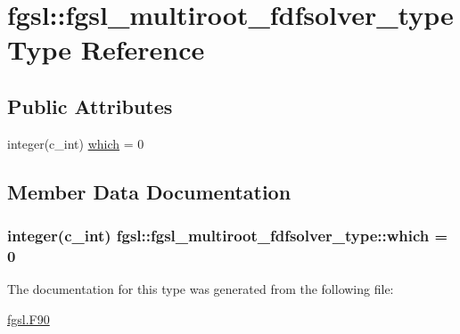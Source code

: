 \hypertarget{structfgsl_1_1fgsl__multiroot__fdfsolver__type}{}\section{fgsl\+:\+:fgsl\+\_\+multiroot\+\_\+fdfsolver\+\_\+type Type Reference}
\label{structfgsl_1_1fgsl__multiroot__fdfsolver__type}
\subsection*{Public Attributes}
\begin{DoxyCompactItemize}
\item 
integer(c\+\_\+int) \hyperlink{structfgsl_1_1fgsl__multiroot__fdfsolver__type_a4ad354f53a02fab56b9bce7f036ac2f9}{which} = 0
\end{DoxyCompactItemize}


\subsection{Member Data Documentation}
\hypertarget{structfgsl_1_1fgsl__multiroot__fdfsolver__type_a4ad354f53a02fab56b9bce7f036ac2f9}{}
\subsubsection[{which}]{\setlength{\rightskip}{0pt plus 5cm}integer(c\+\_\+int) fgsl\+::fgsl\+\_\+multiroot\+\_\+fdfsolver\+\_\+type\+::which = 0}\label{structfgsl_1_1fgsl__multiroot__fdfsolver__type_a4ad354f53a02fab56b9bce7f036ac2f9}


The documentation for this type was generated from the following file\+:\begin{DoxyCompactItemize}
\item 
\hyperlink{fgsl_8F90}{fgsl.\+F90}\end{DoxyCompactItemize}
